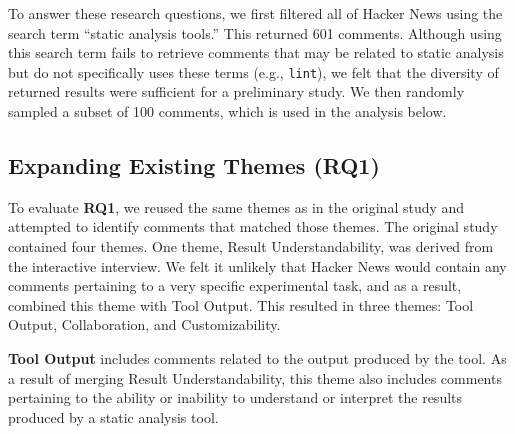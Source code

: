\documentclass{sig-alternate}
\begin{document}







To answer these research questions, we first filtered all of Hacker News using the search term ``static analysis tools.'' This returned 601 comments. Although using this search term fails to retrieve comments that may be related to static analysis but do not specifically uses these terms (e.g., \texttt{lint}), we felt that the diversity of returned results were sufficient for a preliminary study. We then randomly sampled a subset of 100 comments, which is used in the analysis below.


\subsection{Expanding Existing Themes (RQ1)}

To evaluate \textbf{RQ1}, we reused the same themes as in the original study and attempted to identify comments that matched those themes. The original study contained four themes. One theme, Result Understandability, was derived from the interactive interview. We felt it unlikely that Hacker News would contain any comments pertaining to a very specific experimental task, and as a result, combined this theme with Tool Output. This resulted in three themes: Tool Output, Collaboration, and Customizability.

\textbf{Tool Output} includes comments related to the output produced by the tool. As a result of merging Result Understandability, this theme also includes comments pertaining to the ability or inability to understand or interpret the results produced by a static analysis tool.
\end{document}
